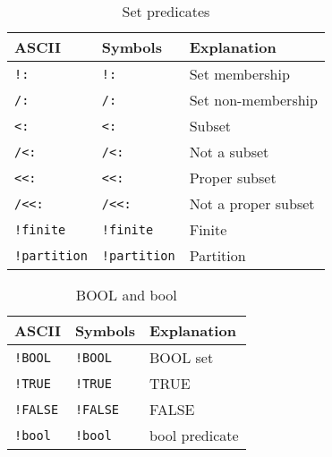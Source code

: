 \begin{EventBNoShortInline}
  \begin{table}[!htbp]
    \centering
    \begin{tabular}{|l|l|l|}
      \hline
      ASCII & Symbols & Explanation \\
      \hline
      \verb$!:$ & \lstinline$!:$ & Set membership \\
      \verb$/:$ & \lstinline$/:$ & Set non-membership \\
      \verb$<:$ & \lstinline$<:$ & Subset \\
      \verb$/<:$ & \lstinline$/<:$ & Not a subset \\
      \verb$<<:$ & \lstinline$<<:$ & Proper subset \\
      \verb$/<<:$ & \lstinline$/<<:$ & Not a proper subset \\
      \verb$!finite$ & \lstinline$!finite$ & Finite \\
      \verb$!partition$ & \lstinline$!partition$ & Partition \\
      \hline
    \end{tabular}
    \caption{Set predicates}
  \end{table}
  
  
  \begin{table}[!htbp]
    \centering
    \begin{tabular}{|l|l|l|}
      \hline
      ASCII & Symbols & Explanation \\
      \hline
      \verb$!BOOL$ & \lstinline$!BOOL$ & BOOL set \\
      \verb$!TRUE$ & \lstinline$!TRUE$ & TRUE \\
      \verb$!FALSE$ & \lstinline$!FALSE$ & FALSE \\
      \verb$!bool$ & \lstinline$!bool$ & bool predicate \\
      \hline
    \end{tabular}
    \caption{BOOL and bool}
  \end{table}
  

\end{EventBNoShortInline}
